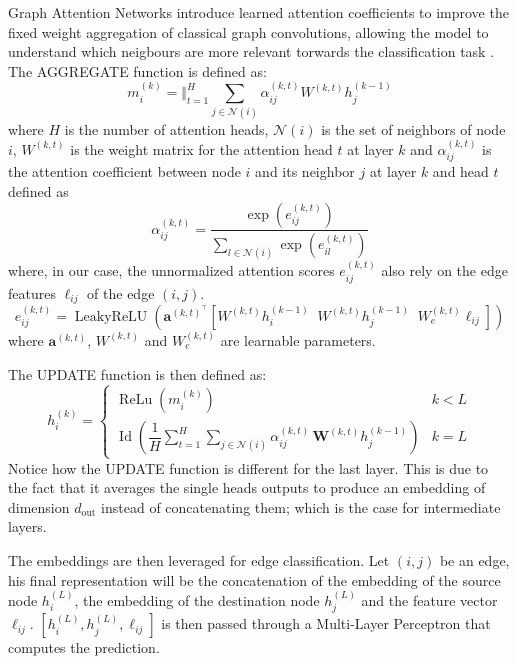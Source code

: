 Graph Attention Networks introduce learned attention coefficients to improve the fixed weight aggregation of classical graph convolutions, allowing the model to understand which neigbours are more relevant torwards the classification task \cite{velickovic2018gat}.
The AGGREGATE function is defined as:
\begin{equation}
  m_i^{(k)} = \Vert_{t=1}^{H} \sum_{j \in \mathcal{N}(i)} \alpha_{ij}^{(k,t)} W^{(k,t)} h_j^{(k-1)}
\end{equation}
where \(H\) is the number of attention heads, \(\mathcal{N}(i)\) is the set of neighbors of node \(i\), \(W^{(k,t)}\) is the weight matrix for the attention head \(t\) at layer \(k\) and \(\alpha_{ij}^{(k,t)}\) is the attention coefficient between node \(i\) and its neighbor \(j\) at layer \(k\) and head \(t\) defined as
\begin{equation}
  \alpha_{ij}^{(k,t)} = \frac{\exp\left( e_{ij}^{(k,t)} \right)}{\sum_{l \in \mathcal{N}(i)} \exp\left( e_{il}^{(k,t)} \right)}
\end{equation}
where, in our case, the unnormalized attention scores \(e_{ij}^{(k,t)}\) also rely on the edge features \(\ell_{ij}\) of the edge \((i,j)\).
\begin{equation}
  e_{ij}^{(k,t)} = \operatorname{LeakyReLU}\left( \mathbf{a}^{(k,t)^\top} \left[ W^{(k,t)} h_i^{(k-1)} \;\; W^{(k,t)} h_j^{(k-1)} \;\; W_e^{(k,t)} \ell_{ij} \right] \right)
\end{equation}
where \(\mathbf{a}^{(k,t)}\), \(W^{(k,t)}\) and \(W_e^{(k,t)}\) are learnable parameters.

The UPDATE function is then defined as:
\begin{equation}
  h_i^{(k)} = \begin{cases}
    \operatorname{ReLu}\!\left( m_i^{(k)} \right)
      & k < L \\
    \operatorname{Id}\!\left(
      \dfrac{1}{H} \displaystyle\sum_{t=1}^{H}
      \sum_{j \in \mathcal{N}(i)} \alpha_{ij}^{(k,t)}\,
      \mathbf{W}^{(k,t)} h_j^{(k-1)}
    \right) & k = L
  \end{cases}
\end{equation}
Notice how the UPDATE function is different for the last layer. This is due to the fact that it averages the single heads outputs to produce an embedding of dimension $d_{\text{out}}$ instead of concatenating them; which is the case for intermediate layers.

The embeddings are then leveraged for edge classification. Let \((i,j)\) be an edge, his final representation will be the concatenation of the embedding of the source node \(h_i^{(L)}\), the embedding of the destination node \(h_j^{(L)}\) and the feature vector \(\ell_{ij}\). \([h_i^{(L)}, h_j^{(L)},\ell_{ij}]\) is then passed through a Multi-Layer Perceptron that computes the prediction.


